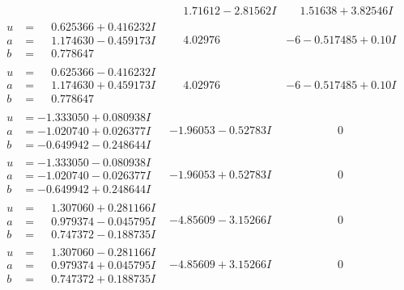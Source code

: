 \documentclass[1p]{elsarticle_modified}
\theoremstyle{definition}
\begin{document}
$$\begin{array}{c|c|c}
 & \phantom{-}1.71612 - 2.81562 I & \phantom{-}1.51638 + 3.82546 I \\ \hline\begin{aligned}
u &= \phantom{-}0.625366 + 0.416232 I \\
a &= \phantom{-}1.174630 - 0.459173 I \\
b &= \phantom{-}0.778647\phantom{ +0.000000I}\end{aligned}
 & \phantom{-}4.02976\phantom{ +0.000000I} &                  -6
-0.517485 + 0. 10   I\phantom{ +0.000000I} \\ \hline\begin{aligned}
u &= \phantom{-}0.625366 - 0.416232 I \\
a &= \phantom{-}1.174630 + 0.459173 I \\
b &= \phantom{-}0.778647\phantom{ +0.000000I}\end{aligned}
 & \phantom{-}4.02976\phantom{ +0.000000I} &                  -6
-0.517485 + 0. 10   I\phantom{ +0.000000I} \\ \hline\begin{aligned}
u &= -1.333050 + 0.080938 I \\
a &= -1.020740 + 0.026377 I \\
b &= -0.649942 - 0.248644 I\end{aligned}
 & -1.96053 - 0.52783 I & \phantom{-0.000000 } 0 \\ \hline\begin{aligned}
u &= -1.333050 - 0.080938 I \\
a &= -1.020740 - 0.026377 I \\
b &= -0.649942 + 0.248644 I\end{aligned}
 & -1.96053 + 0.52783 I & \phantom{-0.000000 } 0 \\ \hline\begin{aligned}
u &= \phantom{-}1.307060 + 0.281166 I \\
a &= \phantom{-}0.979374 - 0.045795 I \\
b &= \phantom{-}0.747372 - 0.188735 I\end{aligned}
 & -4.85609 - 3.15266 I & \phantom{-0.000000 } 0 \\ \hline\begin{aligned}
u &= \phantom{-}1.307060 - 0.281166 I \\
a &= \phantom{-}0.979374 + 0.045795 I \\
b &= \phantom{-}0.747372 + 0.188735 I\end{aligned}
 & -4.85609 + 3.15266 I & \phantom{-0.000000 } 0 \\ \hline\begin{aligned}

\end{aligned}
\end{array}$$
\end{document}
